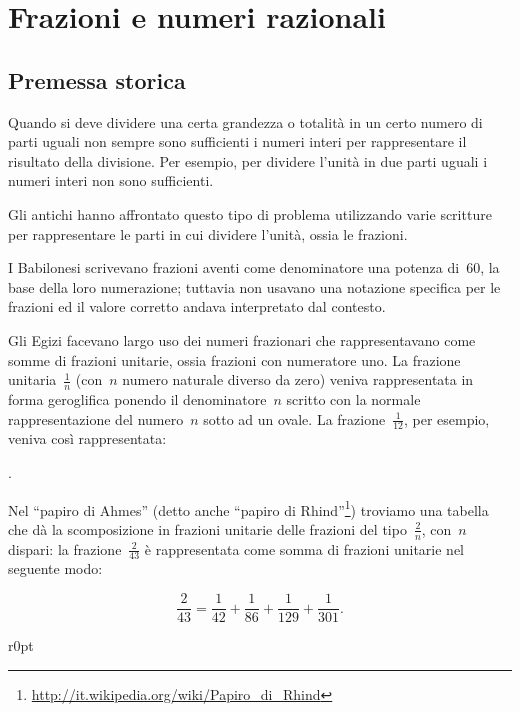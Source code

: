 \chapter{Frazioni e numeri razionali}
\section{Premessa storica}

Quando si deve dividere una certa grandezza o totalità in un certo numero di parti uguali non sempre
sono sufficienti i numeri interi per rappresentare il risultato della divisione. Per esempio, per dividere
l'unità in due parti uguali i numeri interi non sono sufficienti.

Gli antichi hanno affrontato questo tipo di problema utilizzando varie scritture per rappresentare
le parti in cui dividere l'unità, ossia le frazioni.

I Babilonesi scrivevano frazioni aventi come denominatore una potenza di~60, la base della
loro numerazione; tuttavia non usavano una notazione specifica per le frazioni ed
il valore corretto andava interpretato dal contesto.

Gli Egizi facevano largo uso dei numeri frazionari che rappresentavano come somme di frazioni unitarie,
ossia frazioni con numeratore uno. La frazione unitaria~$\frac{1}{n}$ (con~$n$ numero naturale diverso da zero)
veniva rappresentata in forma geroglifica ponendo il denominatore~$n$ scritto con la normale rappresentazione del numero~$n$ sotto ad un ovale. La frazione~$\frac{1}{12}$, per esempio, veniva così rappresentata:

\begin{center}
 .
\end{center}

Nel ``papiro di Ahmes'' (detto anche ``papiro di Rhind''\footnote{\url{http://it.wikipedia.org/wiki/Papiro_di_Rhind}}) troviamo una tabella che dà la scomposizione in frazioni
unitarie delle frazioni del tipo~$\frac{2}{n}$, con~$n$ dispari: la frazione~$\frac{2}{43}$
è rappresentata come somma di frazioni
unitarie nel seguente modo:

\[\frac{2}{43}=\frac{1}{42}+\frac{1}{86}+\frac{1}{129}+\frac{1}{301}.\]
\begin{wrapfigure}{r}{0pt}

\end{wrapfigure}

